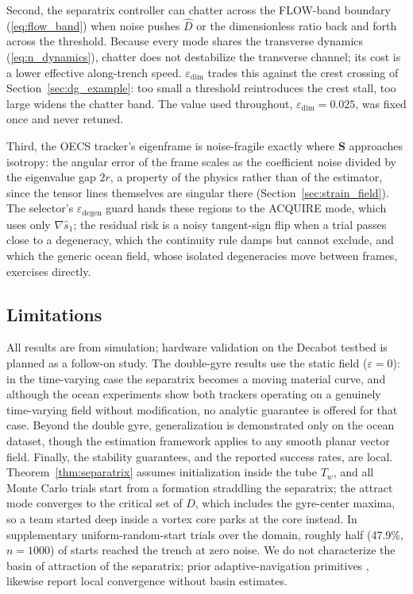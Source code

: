 \documentclass[lettersize,journal]{IEEEtran}
\begin{document}
Second, the separatrix controller can chatter across the FLOW-band
boundary (\ref{eq:flow_band}) when noise pushes $\hat{D}$ or the
dimensionless ratio back and forth across the threshold. Because every
mode shares the transverse dynamics (\ref{eq:n_dynamics}), chatter
does not destabilize the transverse channel; its cost is a lower
effective along-trench speed. $\varepsilon_{\text{dim}}$ trades this
against the crest crossing of Section~\ref{sec:dg_example}: too small
a threshold reintroduces the crest stall, too large widens the chatter
band. The value used throughout, $\varepsilon_{\text{dim}} = 0.025$,
was fixed once and never retuned.

Third, the OECS tracker's eigenframe is noise-fragile exactly where
$\mathbf{S}$ approaches isotropy: the angular error of the frame
scales as the coefficient noise divided by the eigenvalue gap $2r$, a
property of the physics rather than of the estimator, since the tensor
lines themselves are singular there
(Section~\ref{sec:strain_field}). The selector's
$\varepsilon_{\text{degen}}$ guard hands these regions to the ACQUIRE
mode, which uses only $\nabla\hat{s}_1$; the residual risk is a noisy
tangent-sign flip when a trial passes close to a degeneracy, which the
continuity rule damps but cannot exclude, and which the generic ocean
field, whose isolated degeneracies move between frames, exercises
directly.


\subsection{Limitations}
\label{sec:limitations}

All results are from simulation; hardware validation on the Decabot
testbed is planned as a follow-on study. The double-gyre results use
the static field ($\varepsilon = 0$): in the time-varying case the
separatrix becomes a moving material curve, and although the ocean
experiments show both trackers operating on a genuinely time-varying
field without modification, no analytic guarantee is offered for that
case. Beyond the double gyre, generalization is demonstrated only on
the ocean dataset, though the estimation framework applies to any
smooth planar vector field. Finally, the stability guarantees, and the
reported success rates, are local. Theorem~\ref{thm:separatrix}
assumes initialization inside the tube $T_w$, and all Monte Carlo
trials start from a formation straddling the separatrix; the attract
mode converges to the critical set of $D$, which includes the
gyre-center maxima, so a team started deep inside a vortex core parks
at the core instead. In supplementary uniform-random-start trials over
the domain, roughly half (47.9\%, $n = 1000$) of starts reached the
trench at zero noise. We do not characterize the basin of attraction
of the separatrix; prior adaptive-navigation primitives \cite{27},
\cite{28} likewise report local convergence without basin estimates.
\end{document}
